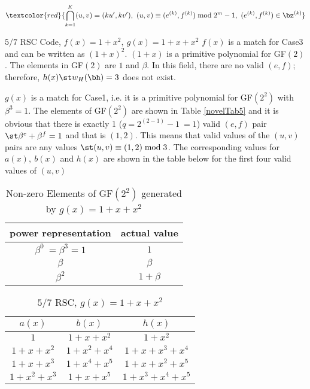  $$\textcolor{red}{\bigcap_{k=1}^{K} (u,v)=(ku',kv'),~(u,v) \equiv (e^{(k)},f^{(k)})\bmod 2^{m}-1,~(e^{(k)}, f^{(k)}) \in \bz^{(k)}} $$



\begin{example}
$5/7$ RSC Code, $f(x)=1+x^2,~g(x)=1+x+x^2$\newline
$f(x)$ is a match for Case3 and can be written as $(1+x)^2$. $(1+x)$ is a primitive polynomial for GF$(2)$. The elements in GF$(2)$ are $1$ and $\beta$. In this field,  there are no valid $(e,f)$; therefore, $h(x) \st w_H(\bh)=3$ does not exist.

$g(x)$ is a match for Case1, i.e. it is a primitive polynomial for GF$(2^2)$ with $\beta^{3}=1$. 
The elements of GF$(2^2)$ are shown in Table \ref{novelTab5} and it is obvious that there is exactly 1 ($q=2^{(2-1)}-1~=1$) valid $(e,f)$ pair $\st \beta^e+\beta^f = 1$ and that is $(1,2)$.
This means that valid values of the $(u,v)$ pairs are any values $\st (u,v) \equiv (1,2) \bmod 3$.  The corresponding values for $a(x),~b(x)$ and $h(x)$ are shown in the table below for the first four valid values of $(u,v)$

 \begin{table*}[h]
 \caption{Non-zero Elements of GF$(2^2)$ generated by $g(x)=1+x+x^2$}
\centering
 \begin{tabular}{c c} 
 \hline
 power representation & actual value \\ [0.5ex] 
 \hline\hline
$\beta^0~=\beta^3=1$ & $1$\\
\hline
$\beta$ & $\beta$\\
\hline
$\beta^2$ &  $1+\beta$\\
 \end{tabular}
 \label{novelTab7}
\end{table*}

\begin{table*}[h]
 \caption{$5/7$ RSC, $g(x)=1+x+x^2$}
\centering
 \begin{tabular}{c c c} 
 \hline
 $a(x)$ & $b(x)$ & $h(x)$\\ [0.5ex] 
 \hline\hline
$1$ & $1+x+x^2$ & $1+x^2$\\ 
\hline
$1+x+x^2$ &  $1+x^2+x^4$ & $1+x+x^3+x^4$ \\
\hline
$1+x+x^3$ & $1+x^4+x^5$ & $1+x+x^2+x^5$\\
\hline
$1+x^2+x^3$ & $1+x+x^5$  &$1+x^3+x^4+x^5$
 \end{tabular}
 \label{novelTab8}
\end{table*}
\end{example}

